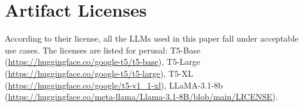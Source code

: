 \begin{table}[ht]
\centering
{}
\caption{Coefficient $\lambda$ settings for different task orders in T$5$ and LLaMA.}
\label{tab:lambda_settings}
\end{table}

\section{Artifact Licenses}
\label{license}
According to their license, all the LLMs used in this paper fall under acceptable use cases. The licenses are listed for perusal: T$5$-Base (\url{https://huggingface.co/google-t5/t5-base}), T$5$-Large (\url{https://huggingface.co/google-t5/t5-large}), T$5$-XL (\url{https://huggingface.co/google/t5-v1_1-xl}), LLaMA-3.1-8b (\url{https://huggingface.co/meta-llama/Llama-3.1-8B/blob/main/LICENSE}).

% 

